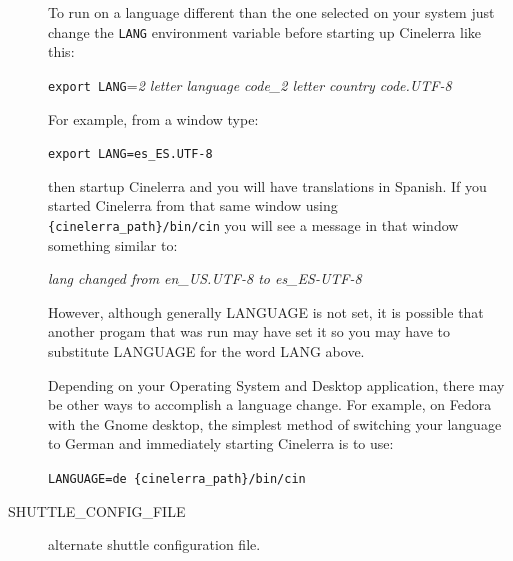 \begin{description}
To run on a language different than the one selected on your system just change 
the \texttt{LANG} environment variable before starting up Cinelerra like this:

\hspace{2em} \texttt{export LANG}=\textit{2 letter language code\_2 letter country code.UTF-8} 

For example, from a window type:

\hspace{2em} \texttt{export LANG=es\_ES.UTF-8} 

then startup Cinelerra and you will have translations in Spanish.  If you started Cinelerra from that same
window using \texttt{\{cinelerra\_path\}/bin/cin} you will see a message in that window something similar to:

\hspace{2em}  \textit{lang changed from en\_US.UTF-8 to es\_ES-UTF-8}

However, although generally LANGUAGE is not set, it is possible that another progam that was run may
have set it so you may have to substitute LANGUAGE for the word LANG above.

Depending on your Operating System and Desktop application, there may be other ways to accomplish a
language change.  For example, on Fedora with the Gnome desktop, the simplest method of switching your
language to German and immediately starting Cinelerra is to use:

\hspace{2em} \texttt{LANGUAGE=de \{cinelerra\_path\}/bin/cin} 


    \item[{\small SHUTTLE\_CONFIG\_FILE}] alternate shuttle configuration file.
\end{description}

